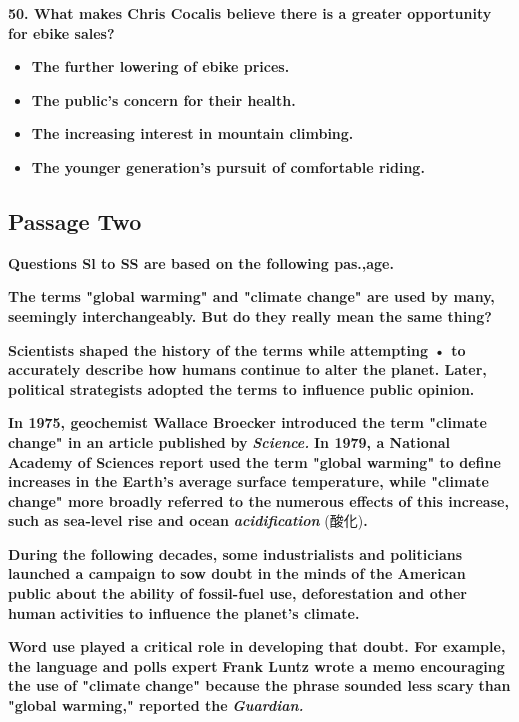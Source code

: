 \documentclass[UTF8,11pt]{ctexart}
\begin{document}
\textbf{50. What makes Chris Cocalis believe there is a greater opportunity for ebike sales?}


\begin{itemize}[leftmargin=2em,itemsep=.2em,topsep=.4em]\item[A.] \textbf{The further lowering of ebike prices.}
\item[B.] \textbf{The public's concern for their health.}
\item[C.] \textbf{The increasing interest in mountain climbing.}
\item[D.] \textbf{The younger generation's pursuit of comfortable riding.}
\end{itemize}

\subsection*{\textbf{Passage Two}}


\textbf{Questions Sl to SS are based on the following pas.,age.}


\textbf{The terms "global warming" and "climate change" are used by many, seemingly interchangeably. But} \textbf{do they really mean the same thing?}


\textbf{Scientists shaped the history of the terms while attempting • to accurately describe how humans} \textbf{continue to alter the planet. Later, political strategists adopted the terms to influence public opinion.}


\textbf{In 1975, geochemist Wallace Broecker introduced the term "climate change"\textperiodcentered{} in an article published} \textbf{by }\textbf{\textit{Science. }}\textbf{In 1979, a National Academy of Sciences report used the term "global warming" to define} \textbf{increases in the Earth's average surface temperature, while "climate change" more broadly referred to the} \textbf{numerous effects of this increase, such as sea-level rise and ocean }\textbf{\textit{acidification }}(酸化)\textbf{.}


\textbf{During the following decades, some industrialists and politicians launched a campaign to sow doubt in} \textbf{the minds of the American public about the ability of fossil-fuel use, deforestation and other human} \textbf{activities to influence the planet's climate.}


\textbf{Word use played a critical role in developing that doubt. For example, the language and polls expert} \textbf{Frank Luntz wrote a memo encouraging the use of "climate change" because the phrase sounded less scary} \textbf{than "global warming," reported the }\textbf{\textit{Guardian.}}
\end{document}

